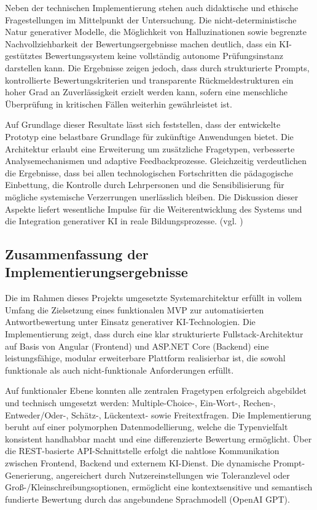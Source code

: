 \documentclass[a4paper,12pt]{article}
\begin{document}
Neben der technischen Implementierung stehen auch didaktische und ethische Fragestellungen im Mittelpunkt der Untersuchung. Die nicht-deterministische Natur generativer Modelle, die Möglichkeit von Halluzinationen sowie begrenzte Nachvollziehbarkeit der Bewertungsergebnisse machen deutlich, dass ein KI-gestütztes Bewertungssystem keine vollständig autonome Prüfungsinstanz darstellen kann. Die Ergebnisse zeigen jedoch, dass durch strukturierte Prompts, kontrollierte Bewertungskriterien und transparente Rückmeldestrukturen ein hoher Grad an Zuverlässigkeit erzielt werden kann, sofern eine menschliche Überprüfung in kritischen Fällen weiterhin gewährleistet ist.

Auf Grundlage dieser Resultate lässt sich feststellen, dass der entwickelte Prototyp eine belastbare Grundlage für zukünftige Anwendungen bietet. Die Architektur erlaubt eine Erweiterung um zusätzliche Fragetypen, verbesserte Analysemechanismen und adaptive Feedbackprozesse. Gleichzeitig verdeutlichen die Ergebnisse, dass bei allen technologischen Fortschritten die pädagogische Einbettung, die Kontrolle durch Lehrpersonen und die Sensibilisierung für mögliche systemische Verzerrungen unerlässlich bleiben. Die Diskussion dieser Aspekte liefert wesentliche Impulse für die Weiterentwicklung des Systems und die Integration generativer KI in reale Bildungsprozesse. (vgl. \cite{luckin})

\subsection{Zusammenfassung der Implementierungsergebnisse}
Die im Rahmen dieses Projekts umgesetzte Systemarchitektur erfüllt in vollem Umfang die Zielsetzung eines funktionalen MVP zur automatisierten Antwortbewertung unter Einsatz generativer KI-Technologien. Die Implementierung zeigt, dass durch eine klar strukturierte Fullstack-Architektur auf Basis von Angular (Frontend) und ASP.NET Core (Backend) eine leistungsfähige, modular erweiterbare Plattform realisierbar ist, die sowohl funktionale als auch nicht-funktionale Anforderungen erfüllt.

Auf funktionaler Ebene konnten alle zentralen Fragetypen erfolgreich abgebildet und technisch umgesetzt werden: Multiple-Choice-, Ein-Wort-, Rechen-, Entweder/Oder-, Schätz-, Lückentext- sowie Freitextfragen. Die Implementierung beruht auf einer polymorphen Datenmodellierung, welche die Typenvielfalt konsistent handhabbar macht und eine differenzierte Bewertung ermöglicht. Über die REST-basierte API-Schnittstelle erfolgt die nahtlose Kommunikation zwischen Frontend, Backend und externem KI-Dienst. Die dynamische Prompt-Generierung, angereichert durch Nutzereinstellungen wie Toleranzlevel oder Groß-/Kleinschreibungsoptionen, ermöglicht eine kontextsensitive und semantisch fundierte Bewertung durch das angebundene Sprachmodell (OpenAI GPT).
\end{document}
